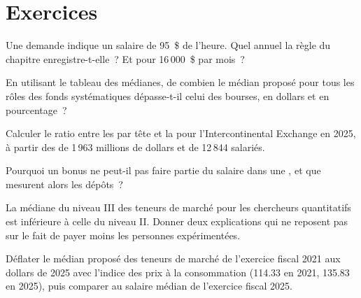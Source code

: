 \section{Exercices}

\begin{exercise}[$\star$]\label{exo:in:pay-levels-by-role-firm-type-and-seniority:1}
Une demande indique un salaire de 95~\$ de l'heure. Quel  annuel la règle du chapitre enregistre-t-elle~? Et pour 16\,000~\$ par mois~?
\end{exercise}

\begin{exercise}[$\star$]\label{exo:in:pay-levels-by-role-firm-type-and-seniority:2}
En utilisant le tableau des médianes, de combien le  médian proposé pour tous les rôles des fonds systématiques dépasse-t-il
celui des bourses, en dollars et en pourcentage~?
\end{exercise}

\begin{exercise}[$\star$]\label{exo:in:pay-levels-by-role-firm-type-and-seniority:3}
Calculer le ratio entre les  par tête et la  pour l'Intercontinental Exchange en 2025, à partir des 
de 1\,963 millions de dollars et de 12\,844 salariés.
\end{exercise}

\begin{exercise}[$\star\star$]\label{exo:in:pay-levels-by-role-firm-type-and-seniority:4}
Pourquoi un bonus ne peut-il pas faire partie du salaire dans une , et que mesurent alors les dépôts~?
\end{exercise}

\begin{exercise}[$\star\star$]\label{exo:in:pay-levels-by-role-firm-type-and-seniority:5}
La médiane du niveau III des teneurs de marché pour les chercheurs quantitatifs est inférieure à celle du niveau II. Donner deux explications
qui ne reposent pas sur le fait de payer moins les personnes expérimentées.
\end{exercise}

\begin{exercise}[$\star\star$]\label{exo:in:pay-levels-by-role-firm-type-and-seniority:6}
Déflater le  médian proposé des teneurs de marché de l'exercice fiscal 2021 aux dollars de 2025 avec l'indice des prix à la consommation (114.33
en 2021, 135.83 en 2025), puis comparer au salaire médian de l'exercice fiscal 2025.
\end{exercise}


